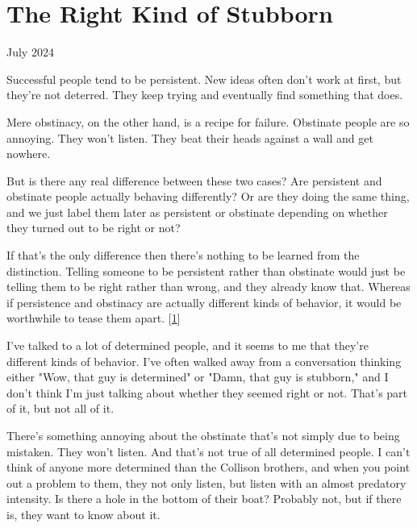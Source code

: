 \chapter{The Right Kind of Stubborn}


          
        
          


          
            
              
                

July 2024

Successful people tend to be persistent.
                  New ideas often don't work at first, but they're not deterred.
                  They keep trying and eventually find something that does.

Mere
                  obstinacy, on the other hand, is a recipe for failure.
                  Obstinate people are so annoying. They won't listen. They beat
                  their heads against a wall and get nowhere.

But is
                  there any real difference between these two cases? Are
                  persistent and obstinate people actually behaving differently?
                  Or are they doing the same thing, and we just label them later
                  as persistent or obstinate depending on whether they turned
                  out to be right or not?

If that's the only
                  difference then there's nothing to be learned from the
                  distinction. Telling someone to be persistent rather than
                  obstinate would just be telling them to be right rather than
                  wrong, and they already know that. Whereas if persistence and
                  obstinacy are actually different kinds of behavior, it would
                  be worthwhile to tease them apart.
                  [\href{\#f1n}{1}]

I've talked to a lot of determined people, and it
                  seems to me that they're different kinds of behavior. I've
                  often walked away from a conversation thinking either "Wow,
                  that guy is determined" or "Damn, that guy is stubborn," and I
                  don't think I'm just talking about whether they seemed right
                  or not. That's part of it, but not all of it.

There's
                  something annoying about the obstinate that's not simply due
                  to being mistaken. They won't listen. And that's not true of
                  all determined people. I can't think of anyone more determined
                  than the Collison brothers, and when you point out a problem
                  to them, they not only listen, but listen with an almost
                  predatory intensity. Is there a hole in the bottom of their
                  boat? Probably not, but if there is, they want to know about
                  it.

